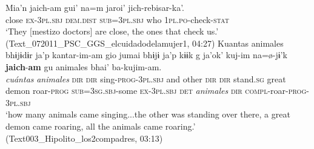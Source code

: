 \documentclass[output=paper,draft,draftmode,colorlinks,citecolor=brown]{langscibook}
\begin{document}
\ea
\label{ex:odam-checkus}
\gll Mia’n 	jaich-am 		gui’ 	na=m jaroi’ 		jich-rebisar-ka’.\\
close	\textsc{ex-3pl.sbj} 	\textsc{dem.dist} 	\textsc{sub=3pl.sbj} who 	\textsc{1pl.po}-check-\textsc{stat}\\
\glt ‘They [mestizo doctors] are close, the ones that check us.’ (Text\_072011\_PSC\_GGS\_elcuidadodelamujer1, 04:27)
\z 
\ea
\label{ex:odam-curesabi}
\gll Kuantas animales bhɨjɨdɨr ja'p kantar-im-am gio jumai bhɨjɨ ja'p kɨɨk g{\ɇ} ja'ok' kuj-im na=\o-jɨ'k \textbf{jaich}-\textbf{am} gu animales bhai' ba-kujim-am.\\
\emph{cuántas} \emph{animales} \textsc{dir} \textsc{dir} sing-\textsc{prog-3pl.sbj} and other \textsc{dir} \textsc{dir} stand.\textsc{sg} great demon roar-\textsc{prog} \textsc{sub=3sg.sbj}-some \textsc{ex-3pl.sbj} \textsc{det} \emph{animales} \textsc{dir} \textsc{compl}-roar-\textsc{prog-3pl.sbj}\\
\glt `how many animals came singing...the other  was standing over there, a great demon came roaring, all the animals came roaring.'
(Text003\_Hipolito\_los2compadres, 03:13)
\z 
\end{document}
